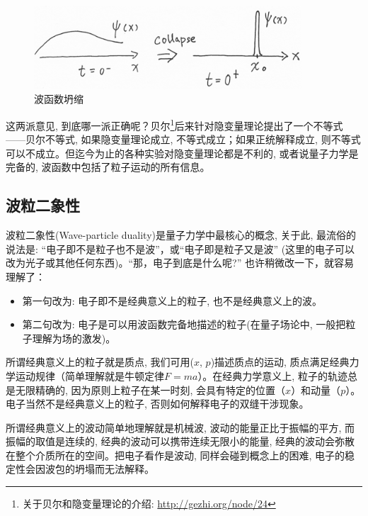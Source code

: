 

\begin{figure}[h]
\begin{center}
\includegraphics[clip,width=10cm]{WaveFunction/wf_collapse.png}
\caption{波函数坍缩}
\end{center}
\end{figure}

这两派意见,
到底哪一派正确呢？贝尔\footnote{关于贝尔和隐变量理论的介绍:
\url{http://gezhi.org/node/24}}后来针对隐变量理论提出了一个不等式——贝尔不等式,
如果隐变量理论成立, 不等式成立；如果正统解释成立,
则不等式可以不成立。但迄今为止的各种实验对隐变量理论都是不利的,
或者说量子力学是完备的, 波函数中包括了粒子运动的所有信息。


\subsection{波粒二象性}


波粒二象性(Wave-particle duality)是量子力学中最核心的概念, 关于此,
最流俗的说法是: ``电子即不是粒子也不是波''，或``电子即是粒子又是波''
(这里的电子可以改为光子或其他任何东西)。``那，电子到底是什么呢?''
也许稍微改一下，就容易理解了：

\begin{itemize}
  \item 第一句改为: 电子即不是经典意义上的粒子,
  也不是经典意义上的波。
  \item 第二句改为: 电子是可以用波函数完备地描述的粒子(在量子场论中,
一般把粒子理解为场的激发)。
\end{itemize}


所谓经典意义上的粒子就是质点, 我们可用($x$, $p$)描述质点的运动,
质点满足经典力学运动规律（简单理解就是牛顿定律$F=ma$）。在经典力学意义上,
粒子的轨迹总是无限精确的, 因为原则上粒子在某一时刻,
会具有特定的位置（$x$）和动量（$p$）。电子当然不是经典意义上的粒子,
否则如何解释电子的双缝干涉现象。

所谓经典意义上的波动简单地理解就是机械波,
波动的能量正比于振幅的平方, 而振幅的取值是连续的,
经典的波动可以携带连续无限小的能量,
经典的波动会弥散在整个介质所在的空间。把电子看作是波动,
同样会碰到概念上的困难, 电子的稳定性会因波包的坍塌而无法解释。

